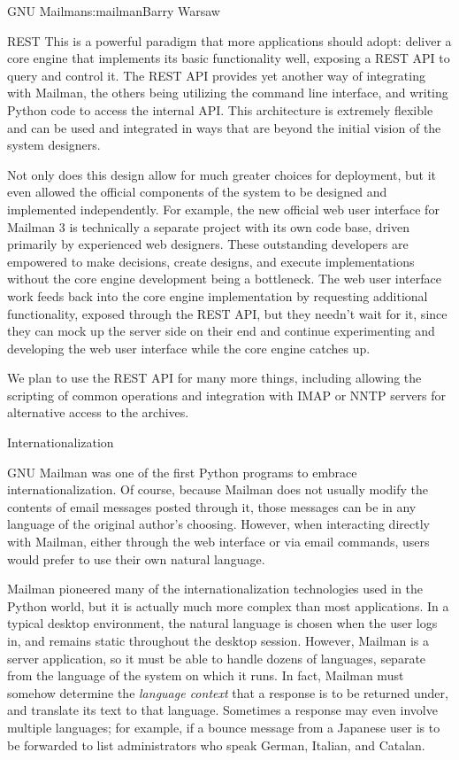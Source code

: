 \begin{aosachapter}{GNU Mailman}{s:mailman}{Barry Warsaw}
\begin{aosasect1}{REST}
This is a powerful paradigm that more applications should adopt:
deliver a core engine that implements its basic functionality well,
exposing a REST API to query and control it.  The REST API provides
yet another way of integrating with Mailman, the others being
utilizing the command line interface, and writing Python code to
access the internal API.  This architecture is extremely flexible and
can be used and integrated in ways that are beyond the initial vision
of the system designers.

Not only does this design allow for much greater choices for
deployment, but it even allowed the official components of the system
to be designed and implemented independently.  For example, the new
official web user interface for Mailman 3 is technically a separate
project with its own code base, driven primarily by experienced web
designers.  These outstanding developers are empowered to make
decisions, create designs, and execute implementations without the
core engine development being a bottleneck.  The web user interface
work feeds back into the core engine implementation by requesting
additional functionality, exposed through the REST API, but they
needn't wait for it, since they can mock up the server side on their
end and continue experimenting and developing the web user interface
while the core engine catches up.

We plan to use the REST API for many more things, including allowing
the scripting of common operations and integration with IMAP or
NNTP servers for alternative access to the archives.

\end{aosasect1}

\begin{aosasect1}{Internationalization}

GNU Mailman was one of the first Python programs to embrace
internationalization.  Of course, because Mailman does not usually
modify the contents of email messages posted through it, those
messages can be in any language of the original author's choosing.
However, when interacting directly with Mailman, either through the
web interface or via email commands, users would prefer to use their
own natural language.

Mailman pioneered many of the internationalization technologies used in the Python 
world, but it is actually much more complex
than most applications.  In a typical desktop environment, the natural
language is chosen when the user logs in, and remains static
throughout the desktop session.  However, Mailman is a server
application, so it must be able to handle dozens of languages,
separate from the language of the system on which it runs.  In fact,
Mailman must somehow determine the \emph{language context} that a
response is to be returned under, and translate its text to that
language.  Sometimes a response may even involve multiple languages;
for example, if a bounce message from a Japanese user is to be
forwarded to list administrators who speak German, Italian, and
Catalan.


\end{aosasect1}
\end{aosachapter}
